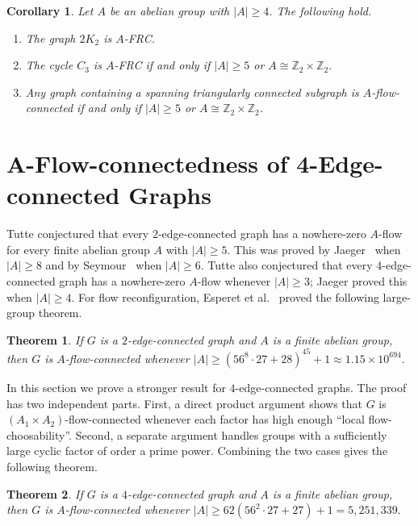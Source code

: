 \documentclass[a4paper,12pt]{article}
\theoremstyle{plain}
\newtheorem{theorem}{Theorem}[section]
\newtheorem{thmA}{Theorem}
\newtheorem{corollary}[theorem]{Corollary}
\theoremstyle{definition}
\renewcommand\ge\geqslant
\begin{document}
\begin{corollary}\label{AFRC-cor}
Let $A$ be an abelian group with $|A| \ge 4$. The following hold.
\begin{enumerate}[label=(\roman*)]
\item \label{2K_2}
The graph $2K_2$ is $A$-FRC. 

\item \label{C_3}
The cycle $C_3$ is $A$-FRC if and only if $|A| \ge 5$ or $A \cong \mathbb{Z}_2 \times \mathbb{Z}_2$. 

\item \label{triangle-connected subgraph}
Any graph containing a spanning triangularly connected subgraph is $A$-flow-connected if and only if $|A| \ge 5$ or $A\cong \mathbb{Z}_2 \times \mathbb{Z}_2$.
\end{enumerate}
\end{corollary}


\section{\texorpdfstring{$\bm{A}$}{A}-Flow-connectedness of 4-Edge-connected Graphs}
\label{4edge-sec}

Tutte conjectured that every $2$-edge-connected graph has a nowhere-zero $A$-flow for every finite abelian group $A$ with $|A|\ge 5$.  This was proved by Jaeger~\cite{jaeger} when $|A|\ge 8$ and by Seymour~\cite{seymour} when $|A|\ge 6$.  Tutte also conjectured that every $4$-edge-connected graph has a nowhere-zero $A$-flow whenever $|A|\ge 3$; Jaeger proved this when $|A|\ge 4$.
For flow reconfiguration, Esperet et al.~\cite{esperet-et-al} proved the following large-group theorem.

\begin{thmA}
    \label{esperet-main-thm}
    If $G$ is a $2$-edge-connected graph and $A$ is a finite abelian group, then $G$ is $A$-flow-connected whenever $|A|\ge (56^8\cdot 27+28)^{45}+1\approx 1.15\times 10^{694}.$
\end{thmA}

In this section we prove a stronger result for $4$-edge-connected graphs.  The proof has two independent parts.  First, a direct product argument shows that $G$ is $(A_1\times A_2)$-flow-connected whenever each factor has high enough ``local flow-choosability''.  Second, a separate argument handles groups with a sufficiently large cyclic factor of order a prime power.  Combining the two cases gives the following theorem.

\begin{theorem}
    \label{4-edge-connected-thm}
    If $G$ is a $4$-edge-connected graph and $A$ is a finite abelian group, then $G$ is $A$-flow-connected whenever
    $
        |A|\ge 62(56^2\cdot 27+27)+1=5,251,339.
    $
\end{theorem}
\end{document}
